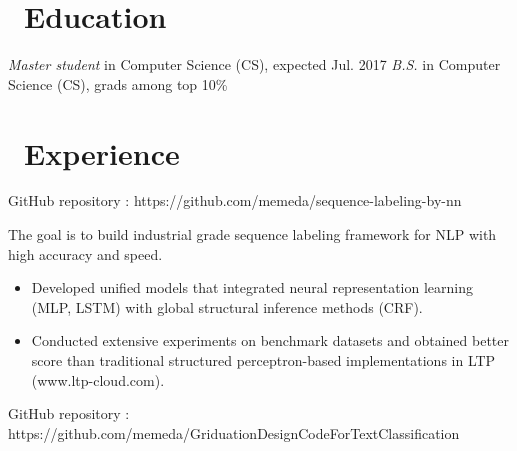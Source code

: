 \documentclass{resume}
\begin{document}


\section{\faGraduationCap\ Education}
\textit{Master student} in Computer Science (CS), expected Jul. 2017
\textit{B.S.} in Computer Science (CS), grads among top 10\%

\section{\faUsers\ Experience}

GitHub repository : https://github.com/memeda/sequence-labeling-by-nn

The goal is to build industrial grade sequence labeling framework for NLP with high accuracy and speed.
\begin{itemize}
  \item Developed unified models that integrated neural representation learning (MLP, LSTM) with global structural inference methods (CRF).
  \item Conducted extensive experiments on benchmark datasets and obtained better score than traditional structured perceptron-based implementations in LTP (www.ltp-cloud.com).
\end{itemize}

GitHub repository : https://github.com/memeda/GriduationDesignCodeForTextClassification
\end{document}
